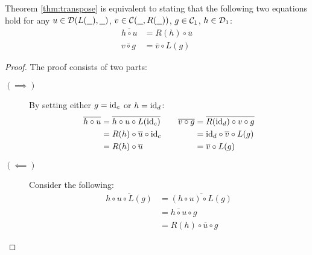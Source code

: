 \begin{theorem}
  Theorem \ref{thm:transpose} is equivalent to stating that the following two
  equations hold for any $u\in \mathcal{D}(L(\underline{\ \ }), \underline{\ \ })$, $v\in \mathcal{C}(\underline{\ \ }, R(\underline{\ \ }))$,
  $g \in \mathcal{C}_1$, $h\in \mathcal{D}_1$:
  \begin{align*}
    \overline{h\circ u} &= R(h) \circ \overline{u}\\
    \overline{v\circ g} &= \overline{v} \circ L(g)
  \end{align*}

  \begin{proof}
    The proof consists of two parts:
    \begin{description}
      \item[$(\implies)$] By setting either $g=\mathrm{id}_c$ or $h=\mathrm{id}_d$:
        \[
          \begin{aligned}
            \overline{h\circ u}
              &= \overline{h\circ u \circ L(\mathrm{id}_c)}\\
              &= R(h) \circ \overline{u} \circ \mathrm{id}_c\\
              &= R(h) \circ \overline{u}
          \end{aligned}
          \qquad
          \begin{aligned}
            \overline{v\circ g}
              &= \overline{R(\mathrm{id}_d)\circ v\circ g}\\
              &= \mathrm{id}_d \circ \overline{v} \circ L(g)\\
              &= \overline{v} \circ L(g)
          \end{aligned}
        \]
      \item[$(\impliedby)$] Consider the following:
        \[
          \begin{aligned}
            \overline{h \circ u\circ L(g)}
              &= \overline{(h \circ u)\circ L(g)}\\
              &= \overline{h\circ u} \circ g\\
              &= R(h) \circ \overline{u} \circ g
          \end{aligned}
        \]
    \end{description}
  \end{proof}
\end{theorem}

